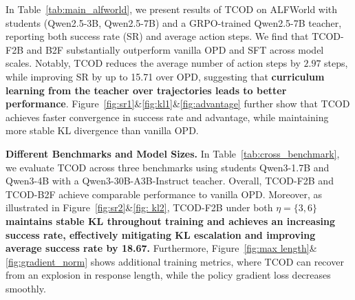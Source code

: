 \documentclass{article} %
\newcommand{\ours}{TCOD\xspace}
\begin{document}
In Table~\ref{tab:main_alfworld}, we present results of \ours on ALFWorld with students (Qwen2.5-3B, Qwen2.5-7B) and a GRPO-trained Qwen2.5-7B teacher, reporting both success rate (SR) and average action steps.
We find that \ours-F2B and B2F substantially outperform vanilla OPD and SFT across model scales. 
Notably, \ours reduces the average number of action steps by $2.97$ steps, while improving SR by up to 15.71 over OPD, suggesting that \textbf{curriculum learning from the teacher over trajectories leads to better performance}.
Figure~\ref{fig:sr1}\&\ref{fig:kl1}\&\ref{fig:advantage} further show that \ours achieves faster convergence in success rate and advantage, while maintaining more stable KL divergence than vanilla OPD.

\textbf{Different Benchmarks and Model Sizes.}
In Table~\ref{tab:cross_benchmark}, we evaluate \ours across three benchmarks using students Qwen3-1.7B and Qwen3-4B with a Qwen3-30B-A3B-Instruct teacher.
Overall, \ours-F2B and \ours-B2F achieve comparable performance to vanilla OPD.
Moreover, 
as illustrated in Figure~\ref{fig:sr2}\&\ref{fig: kl2}, \ours-F2B under both $\eta=\{3,6\}$ \textbf{maintains stable KL throughout training and achieves an increasing success rate, effectively mitigating KL escalation and improving average success rate by 18.67.}
Furthermore, Figure~\ref{fig:max length}\&\ref{fig:gradient_norm} shows additional training metrics, where \ours can recover from an explosion in response length, while the policy gradient loss decreases smoothly.
\end{document}
